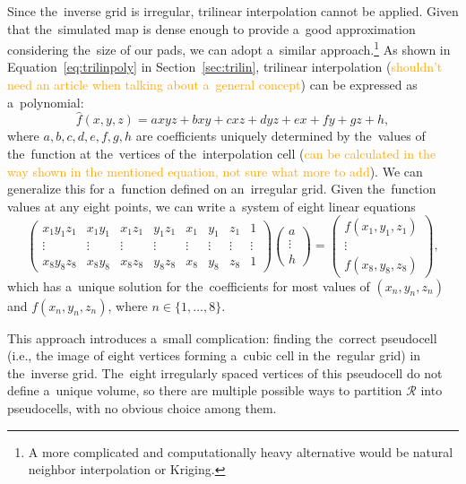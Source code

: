 			Since the~inverse grid is irregular, trilinear interpolation cannot be applied. Given that the~simulated map is dense enough to provide a~good approximation considering the~size of our pads, we can adopt a~similar approach.\footnote{A more complicated and computationally heavy alternative would be natural neighbor interpolation or Kriging.} As shown in Equation~\ref{eq:trilinpoly} in Section~\ref{sec:trilin}, trilinear interpolation (\textcolor{orange}{shouldn't need an article when talking about a~general concept}) can be expressed as a~polynomial:
				\begin{equation}
					\widehat{f}(x,y,z) = axyz + bxy + cxz + dyz + ex + fy + gz + h,
				\end{equation}
			where $a,b,c,d,e,f,g,h$ are coefficients uniquely determined by the~values of the~function at the~vertices of the~interpolation cell (\textcolor{orange}{can be calculated in the way shown in the mentioned equation, not sure what more to add}). We can generalize this for a~function defined on an~irregular grid. Given the~function values at any eight points, we can write a~system of eight linear equations
				\begin{equation}
					\begin{pmatrix}
						x_1 y_1 z_1 & x_1 y_1 & x_1 z_1 & y_1 z_1 & x_1 & y_1 & z_1 & 1\\
						\vdots & \vdots & \vdots & \vdots & \vdots & \vdots & \vdots & \vdots\\
						x_8 y_8 z_8 & x_8 y_8 & x_8 z_8 & y_8 z_8 & x_8 & y_8 & z_8 & 1
					\end{pmatrix}
					\begin{pmatrix}
						a\\
						\vdots\\
						h
					\end{pmatrix}
					=
					\begin{pmatrix}
						f(x_1,y_1,z_1)\\
						\vdots\\
						f(x_8,y_8,z_8)
					\end{pmatrix},
				\end{equation}
			which has a~unique solution for the~coefficients for most values of $(x_n, y_n, z_n)$ and $f(x_n,y_n,z_n)$, where $n\in\{1,\ldots,8\}$.
			
			This approach introduces a~small complication: finding the~correct pseudocell (i.e., the image of eight vertices forming a~cubic cell in the~regular grid) in the~inverse grid. The~eight irregularly spaced vertices of this pseudocell do not define a~unique volume, so there are multiple possible ways to partition $\mathcal{R}$ into pseudocells, with no obvious choice among them.
			
